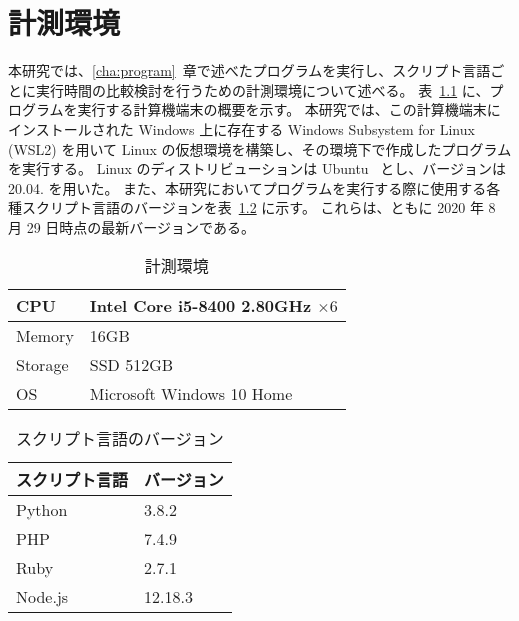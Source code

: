 \chapter{計測環境}
\label{cha:environment}

本研究では、\ref{cha:program}~章で述べたプログラムを実行し、スクリプト言語ごとに実行時間の比較検討を行うための計測環境について述べる。
表~\ref{tbl:environment} に、プログラムを実行する計算機端末の概要を示す。
本研究では、この計算機端末にインストールされた Windows 上に存在する Windows Subsystem for Linux (WSL2) を用いて
Linux の仮想環境を構築し、その環境下で作成したプログラムを実行する。
Linux のディストリビューションは Ubuntu~\cite{Ubuntu} とし、バージョンは 20.04. を用いた。
また、本研究においてプログラムを実行する際に使用する各種スクリプト言語のバージョンを表~\ref{tbl:language-version} に示す。
これらは、ともに 2020 年 8 月 29 日時点の最新バージョンである。

\begin{table}[htbp]
\begin{center}
\caption{計測環境}
\label{tbl:environment}
\begin{tabular}{|l||l|} \hline
CPU & Intel Core i5-8400 2.80GHz $\times 6$ \\ \hline
Memory & 16GB \\ \hline
Storage & SSD 512GB \\ \hline
OS & Microsoft Windows 10 Home \\ \hline
\end{tabular}
\end{center}
\end{table}

\begin{table}[htbp]
\begin{center}
\caption{スクリプト言語のバージョン}
\label{tbl:language-version}
\begin{tabular}{|l|l|} \hline
スクリプト言語 & バージョン \\ \hline \hline
Python & 3.8.2 \\ \hline
PHP & 7.4.9 \\ \hline
Ruby & 2.7.1 \\ \hline
Node.js & 12.18.3 \\ \hline
\end{tabular}
\end{center}
\end{table}

